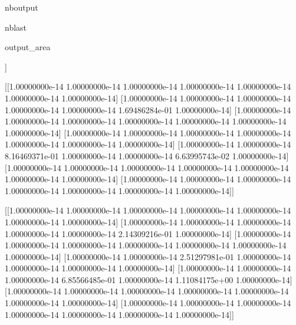 \documentclass[letterpaper,10pt,english]{sphinxmanual}
\begin{document}
\begin{sphinxuseclass}{nboutput}
\begin{sphinxuseclass}{nblast}
{\begin{sphinxuseclass}{output_area}
\begin{sphinxuseclass}{}
\begin{sphinxVerbatim}[commandchars=\\\{\}]
  [[1.00000000e-14 1.00000000e-14 1.00000000e-14 1.00000000e-14
    1.00000000e-14 1.00000000e-14 1.00000000e-14]
   [1.00000000e-14 1.00000000e-14 1.00000000e-14 1.00000000e-14
    1.00000000e-14 1.00000000e-14 1.00000000e-14]
   [1.00000000e-14 1.00000000e-14 5.34315050e-01 1.00000000e-14
    4.15218249e-02 1.00000000e-14 1.00000000e-14]
   [1.00000000e-14 1.00000000e-14 1.00000000e-14 1.00000000e-14
    1.00000000e-14 1.00000000e-14 1.00000000e-14]
   [1.00000000e-14 1.00000000e-14 1.00000000e-14 1.00000000e-14
    4.28144723e-01 5.49222976e-02 1.00000000e-14]
   [1.00000000e-14 1.00000000e-14 1.00000000e-14 1.00000000e-14
    1.00000000e-14 1.00000000e-14 2.89329551e-02]
   [1.00000000e-14 1.00000000e-14 1.00000000e-14 1.00000000e-14
    1.00000000e-14 1.00000000e-14 1.00000000e-14]]

  [[1.00000000e-14 1.00000000e-14 1.00000000e-14 1.00000000e-14
    1.00000000e-14 1.00000000e-14 1.00000000e-14]
   [1.00000000e-14 1.00000000e-14 1.00000000e-14 1.00000000e-14
    1.00000000e-14 1.69486284e-01 1.00000000e-14]
   [1.00000000e-14 1.00000000e-14 1.00000000e-14 1.00000000e-14
    1.00000000e-14 1.00000000e-14 1.00000000e-14]
   [1.00000000e-14 1.00000000e-14 1.00000000e-14 1.00000000e-14
    1.00000000e-14 1.00000000e-14 1.00000000e-14]
   [1.00000000e-14 1.00000000e-14 8.16469371e-01 1.00000000e-14
    1.00000000e-14 6.63995743e-02 1.00000000e-14]
   [1.00000000e-14 1.00000000e-14 1.00000000e-14 1.00000000e-14
    1.00000000e-14 1.00000000e-14 1.00000000e-14]
   [1.00000000e-14 1.00000000e-14 1.00000000e-14 1.00000000e-14
    1.00000000e-14 1.00000000e-14 1.00000000e-14]]

  [[1.00000000e-14 1.00000000e-14 1.00000000e-14 1.00000000e-14
    1.00000000e-14 1.00000000e-14 1.00000000e-14]
   [1.00000000e-14 1.00000000e-14 1.00000000e-14 1.00000000e-14
    1.00000000e-14 2.14309216e-01 1.00000000e-14]
   [1.00000000e-14 1.00000000e-14 1.00000000e-14 1.00000000e-14
    1.00000000e-14 1.00000000e-14 1.00000000e-14]
   [1.00000000e-14 1.00000000e-14 2.51297981e-01 1.00000000e-14
    1.00000000e-14 1.00000000e-14 1.00000000e-14]
   [1.00000000e-14 1.00000000e-14 1.00000000e-14 6.85566485e-01
    1.00000000e-14 1.11084175e+00 1.00000000e-14]
   [1.00000000e-14 1.00000000e-14 1.00000000e-14 1.00000000e-14
    1.00000000e-14 1.00000000e-14 1.00000000e-14]
   [1.00000000e-14 1.00000000e-14 1.00000000e-14 1.00000000e-14
    1.00000000e-14 1.00000000e-14 1.00000000e-14]]


\end{sphinxVerbatim}
\end{sphinxuseclass}
\end{sphinxuseclass}}
\end{sphinxuseclass}
\end{sphinxuseclass}
\end{document}
